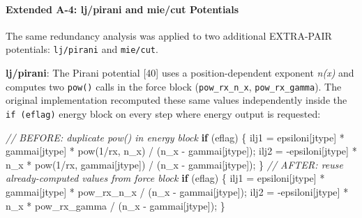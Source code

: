 \documentclass[
  11pt,
]{article}
\newenvironment{Shaded}{}{}
\newcommand{\CommentTok}[1]{\textcolor[rgb]{0.38,0.63,0.69}{\textit{#1}}}
\newcommand{\ControlFlowTok}[1]{\textcolor[rgb]{0.00,0.44,0.13}{\textbf{#1}}}
\newcommand{\DecValTok}[1]{\textcolor[rgb]{0.25,0.63,0.44}{#1}}
\newcommand{\NormalTok}[1]{#1}
\newcommand{\OperatorTok}[1]{\textcolor[rgb]{0.40,0.40,0.40}{#1}}
\begin{document}
\paragraph{Extended A-4: lj/pirani and mie/cut
Potentials}\label{extended-a-4-ljpirani-and-miecut-potentials}

The same redundancy analysis was applied to two additional EXTRA-PAIR
potentials: \texttt{lj/pirani} and \texttt{mie/cut}.

\textbf{lj/pirani}: The Pirani potential {[}40{]} uses a
position-dependent exponent \emph{n(x)} and computes two \texttt{pow()}
calls in the force block (\texttt{pow\_rx\_n\_x},
\texttt{pow\_rx\_gamma}). The original implementation recomputed these
same values independently inside the \texttt{if\ (eflag)} energy block
on every step where energy output is requested:

\begin{Shaded}
\begin{Highlighting}[]
\CommentTok{// BEFORE: duplicate pow() in energy block}
\ControlFlowTok{if} \OperatorTok{(}\NormalTok{eflag}\OperatorTok{)} \OperatorTok{\{}
\NormalTok{  ilj1 }\OperatorTok{=}\NormalTok{ epsiloni}\OperatorTok{[}\NormalTok{jtype}\OperatorTok{]} \OperatorTok{*}\NormalTok{ gammai}\OperatorTok{[}\NormalTok{jtype}\OperatorTok{]} \OperatorTok{*}\NormalTok{ pow}\OperatorTok{(}\DecValTok{1}\OperatorTok{/}\NormalTok{rx}\OperatorTok{,}\NormalTok{ n\_x}\OperatorTok{)} \OperatorTok{/} \OperatorTok{(}\NormalTok{n\_x }\OperatorTok{{-}}\NormalTok{ gammai}\OperatorTok{[}\NormalTok{jtype}\OperatorTok{]);}
\NormalTok{  ilj2 }\OperatorTok{=} \OperatorTok{{-}}\NormalTok{epsiloni}\OperatorTok{[}\NormalTok{jtype}\OperatorTok{]} \OperatorTok{*}\NormalTok{ n\_x }\OperatorTok{*}\NormalTok{ pow}\OperatorTok{(}\DecValTok{1}\OperatorTok{/}\NormalTok{rx}\OperatorTok{,}\NormalTok{ gammai}\OperatorTok{[}\NormalTok{jtype}\OperatorTok{])} \OperatorTok{/} \OperatorTok{(}\NormalTok{n\_x }\OperatorTok{{-}}\NormalTok{ gammai}\OperatorTok{[}\NormalTok{jtype}\OperatorTok{]);}
\OperatorTok{\}}
\CommentTok{// AFTER: reuse already{-}computed values from force block}
\ControlFlowTok{if} \OperatorTok{(}\NormalTok{eflag}\OperatorTok{)} \OperatorTok{\{}
\NormalTok{  ilj1 }\OperatorTok{=}\NormalTok{ epsiloni}\OperatorTok{[}\NormalTok{jtype}\OperatorTok{]} \OperatorTok{*}\NormalTok{ gammai}\OperatorTok{[}\NormalTok{jtype}\OperatorTok{]} \OperatorTok{*}\NormalTok{ pow\_rx\_n\_x }\OperatorTok{/} \OperatorTok{(}\NormalTok{n\_x }\OperatorTok{{-}}\NormalTok{ gammai}\OperatorTok{[}\NormalTok{jtype}\OperatorTok{]);}
\NormalTok{  ilj2 }\OperatorTok{=} \OperatorTok{{-}}\NormalTok{epsiloni}\OperatorTok{[}\NormalTok{jtype}\OperatorTok{]} \OperatorTok{*}\NormalTok{ n\_x }\OperatorTok{*}\NormalTok{ pow\_rx\_gamma }\OperatorTok{/} \OperatorTok{(}\NormalTok{n\_x }\OperatorTok{{-}}\NormalTok{ gammai}\OperatorTok{[}\NormalTok{jtype}\OperatorTok{]);}
\OperatorTok{\}}
\end{Highlighting}
\end{Shaded}
\end{document}
